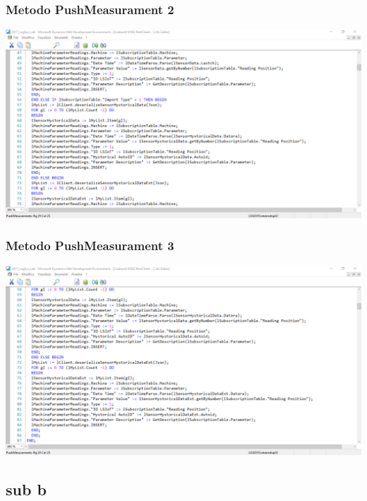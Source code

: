 \documentclass{beamer}
\begin{document}
\begin{frame}
\frametitle{Metodo PushMeasurament 2}
\includegraphics[width=1\textwidth]{images/NAVPushMeasuraments2.png}
\end{frame}

\begin{frame}
\frametitle{Metodo PushMeasurament 3}
\includegraphics[width=1\textwidth]{images/NAVPushMeasuraments3.png}
\end{frame}






\subsection{sub b}
\end{document}
